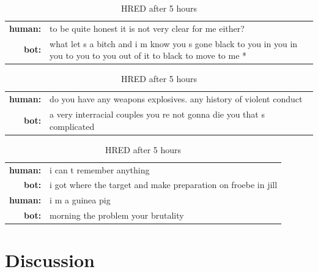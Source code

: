 \documentclass[letterpaper]{article}
\begin{document}
\begin{table}[bt!]
    \centering
    \small
    \caption{\small HRED after 5 hours}
    \begin{tabularx}{0.48\textwidth}{rX}
        \hline \hline
        \textbf{human:} & to be quite honest it is not very clear for me either?    \\
        \textbf{bot:} & what let s a  bitch and i m know you s gone black to you in you in you to you to you out of it to black to move to me *\\
        \hline \hline    
    \end{tabularx}
    \label{table:mi_03}
\end{table}

\begin{table}[bt!]
    \centering
    \small
    \caption{\small HRED after 5 hours}
    \begin{tabularx}{0.48\textwidth}{rX}
        \hline \hline
        \textbf{human:} & do you have any weapons explosives. any history of violent conduct \\
        \textbf{bot:} & a very interracial couples you re not gonna die you that s complicated \\
        \hline \hline    
    \end{tabularx}
    \label{table:mi_03}
\end{table}

\begin{table}[bt!]
    \centering
    \small
    \caption{\small HRED after 5 hours}
    \begin{tabularx}{0.48\textwidth}{rX}
        \hline \hline
        \textbf{human:} & i can t remember anything \\
        \textbf{bot:} & i got where the target and make preparation on froebe in jill \\
        \textbf{human:} & i m a guinea pig \\
        \textbf{bot: } & morning the problem your brutality \\
        \hline \hline    
    \end{tabularx}
    \label{table:mi_03}
\end{table}


\section{Discussion}

%
%


\end{document}
